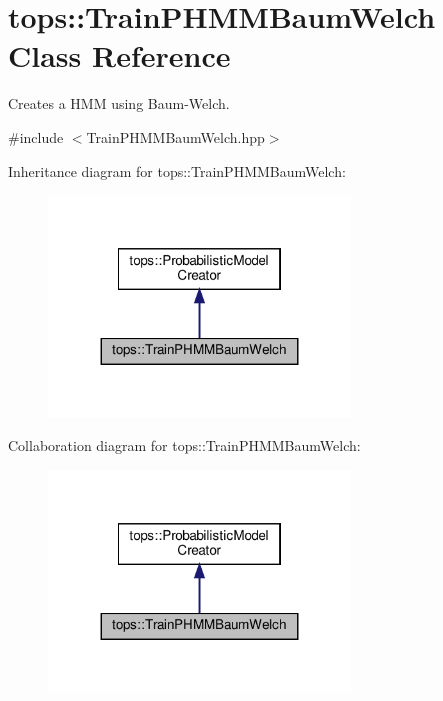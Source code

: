 \hypertarget{classtops_1_1TrainPHMMBaumWelch}{}\section{tops\+:\+:Train\+P\+H\+M\+M\+Baum\+Welch Class Reference}
\label{classtops_1_1TrainPHMMBaumWelch}


Creates a H\+MM using Baum-\/\+Welch.  




{\ttfamily \#include $<$Train\+P\+H\+M\+M\+Baum\+Welch.\+hpp$>$}



Inheritance diagram for tops\+:\+:Train\+P\+H\+M\+M\+Baum\+Welch\+:
\nopagebreak
\begin{figure}[H]
\begin{center}
\leavevmode
\includegraphics[width=227pt]{classtops_1_1TrainPHMMBaumWelch__inherit__graph}
\end{center}
\end{figure}


Collaboration diagram for tops\+:\+:Train\+P\+H\+M\+M\+Baum\+Welch\+:
\nopagebreak
\begin{figure}[H]
\begin{center}
\leavevmode
\includegraphics[width=227pt]{classtops_1_1TrainPHMMBaumWelch__coll__graph}
\end{center}
\end{figure}
